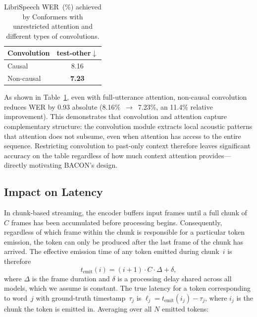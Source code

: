 \documentclass[cameraready]{Interspeech}
\begin{document}
\begin{table}[h]
\centering
\caption{LibriSpeech WER~(\%) achieved by
Conformers with unrestricted attention and different types of convolutions.}
\label{tab:analysis-fullctx}
\begin{tabular}{lc}
\toprule
\textbf{Convolution} & \textbf{test-other}$\downarrow$ \\
\midrule
Causal      & 8.16 \\
Non-causal  & \textbf{7.23} \\
\bottomrule
\end{tabular}
\end{table}

As shown in Table~\ref{tab:analysis-fullctx}, even with full-utterance attention, non-causal convolution reduces WER by 0.93
absolute (8.16\%~$\rightarrow$~7.23\%, an 11.4\% relative improvement). This
demonstrates that convolution and attention capture complementary structure:
the convolution module extracts local acoustic patterns that attention does not
subsume, even when attention has access to the entire sequence. Restricting
convolution to past-only context therefore leaves significant accuracy on the
table regardless of how much context attention provides---directly motivating
BACON's design.

\subsection{Impact on Latency}

In chunk-based streaming, the encoder buffers input frames until a full chunk
of $C$ frames has been accumulated before processing begins. Consequently,
regardless of which frame within the chunk is responsible for a particular
token emission, the token can only be produced after the last frame of the
chunk has arrived. The effective emission time of any token emitted during
chunk~$i$ is therefore
\begin{equation}
    t_{\text{emit}}(i) = (i+1) \cdot C \cdot \Delta + \delta,
    \label{eq:emit-time}
\end{equation}
where $\Delta$ is the frame duration and $\delta$ is a processing
delay shared across all models, which we assume is constant. The true latency for a token corresponding to word~$j$ with
ground-truth timestamp~$\tau_j$ is
$\ell_j = t_{\text{emit}}(i_j) - \tau_j$,
where $i_j$ is the chunk the token is emitted in. Averaging over all
$N$ emitted tokens:
\end{document}
